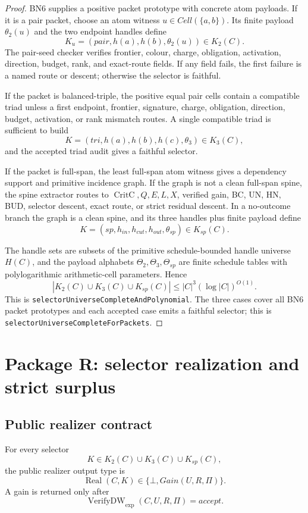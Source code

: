 \documentclass[10.5pt,a4paper]{article}
\newcommand{\Real}{\operatorname{Real}}
\newcommand{\VerifyDW}{\operatorname{VerifyDW}_{\exp}}
\newcommand{\CritC}{\operatorname{CritC}}
\newcommand{\Bot}{\bot}
\begin{document}
\begin{proof}
BN6 supplies a positive packet prototype with concrete atom payloads.  If it is a pair packet, choose an atom witness \(u\in Cell(\{a,b\})\).  Its finite payload \(\theta_2(u)\) and the two endpoint handles define
\[
K_u=(pair,h(a),h(b),\theta_2(u))\in K_2(C).
\]
The pair-seed checker verifies frontier, colour, charge, obligation, activation, direction, budget, rank, and exact-route fields.  If any field fails, the first failure is a named route or descent; otherwise the selector is faithful.

If the packet is balanced-triple, the positive equal pair cells contain a compatible triad unless a first endpoint, frontier, signature, charge, obligation, direction, budget, activation, or rank mismatch routes.  A single compatible triad is sufficient to build
\[
K=(tri,h(a),h(b),h(c),\theta_3)\in K_3(C),
\]
and the accepted triad audit gives a faithful selector.

If the packet is full-span, the least full-span atom witness gives a dependency support and primitive incidence graph.  If the graph is not a clean full-span spine, the spine extractor routes to \(\CritC,Q,E,L,X\), verified gain, BC, UN, HN, BUD, selector descent, exact route, or strict residual descent.  In a no-outcome branch the graph is a clean spine, and its three handles plus finite payload define
\[
K=(sp,h_{in},h_{cut},h_{out},\theta_{sp})\in K_{sp}(C).
\]

The handle sets are subsets of the primitive schedule-bounded handle universe \(H(C)\), and the payload alphabets \(\Theta_2,\Theta_3,\Theta_{sp}\) are finite schedule tables with polylogarithmic arithmetic-cell parameters.  Hence
\[
|K_2(C)\cup K_3(C)\cup K_{sp}(C)|\le |C|^3(\log |C|)^{O(1)}.
\]
This is \texttt{selectorUniverseCompleteAndPolynomial}.  The three cases cover all BN6 packet prototypes and each accepted case emits a faithful selector; this is \texttt{selectorUniverseCompleteForPackets}.
\end{proof}

\section{Package R: selector realization and strict surplus}

\subsection{Public realizer contract}
For every selector
\[
K\in K_2(C)\cup K_3(C)\cup K_{sp}(C),
\]
the public realizer output type is
\[
\Real(C,K)\in\{\Bot,Gain(U,R,\Pi)\}.
\]
A gain is returned only after
\[
\VerifyDW(C,U,R,\Pi)=accept.
\]
\end{document}
